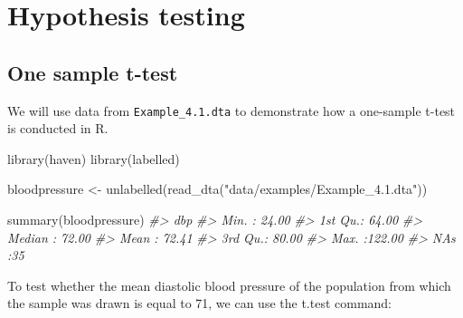 \documentclass[
]{memoir}
\newenvironment{Shaded}{\begin{snugshade}}{\end{snugshade}}
\newcommand{\AttributeTok}[1]{\textcolor[rgb]{0.77,0.63,0.00}{#1}}
\newcommand{\CommentTok}[1]{\textcolor[rgb]{0.56,0.35,0.01}{\textit{#1}}}
\newcommand{\DecValTok}[1]{\textcolor[rgb]{0.00,0.00,0.81}{#1}}
\newcommand{\FunctionTok}[1]{\textcolor[rgb]{0.00,0.00,0.00}{#1}}
\newcommand{\NormalTok}[1]{#1}
\newcommand{\OtherTok}[1]{\textcolor[rgb]{0.56,0.35,0.01}{#1}}
\newcommand{\SpecialCharTok}[1]{\textcolor[rgb]{0.00,0.00,0.00}{#1}}
\newcommand{\StringTok}[1]{\textcolor[rgb]{0.31,0.60,0.02}{#1}}
\begin{document}
\hypertarget{hypothesis-testing}{%
\chapter{Hypothesis testing}\label{hypothesis-testing}}

\hypertarget{one-sample-t-test}{%
\section{One sample t-test}\label{one-sample-t-test}}

We will use data from \texttt{Example\_4.1.dta} to demonstrate how a one-sample t-test is conducted in R.

\begin{Shaded}
\begin{Highlighting}[]
\FunctionTok{library}\NormalTok{(haven)}
\FunctionTok{library}\NormalTok{(labelled)}

\NormalTok{bloodpressure }\OtherTok{\textless{}{-}} \FunctionTok{unlabelled}\NormalTok{(}\FunctionTok{read\_dta}\NormalTok{(}\StringTok{"data/examples/Example\_4.1.dta"}\NormalTok{))}

\FunctionTok{summary}\NormalTok{(bloodpressure)}
\CommentTok{\#\textgreater{}       dbp        }
\CommentTok{\#\textgreater{}  Min.   : 24.00  }
\CommentTok{\#\textgreater{}  1st Qu.: 64.00  }
\CommentTok{\#\textgreater{}  Median : 72.00  }
\CommentTok{\#\textgreater{}  Mean   : 72.41  }
\CommentTok{\#\textgreater{}  3rd Qu.: 80.00  }
\CommentTok{\#\textgreater{}  Max.   :122.00  }
\CommentTok{\#\textgreater{}  NA\textquotesingle{}s   :35}
\end{Highlighting}
\end{Shaded}

To test whether the mean diastolic blood pressure of the population from which the sample was drawn is equal to 71, we can use the t.test command:

\begin{Shaded}
\end{Shaded}
\end{document}
